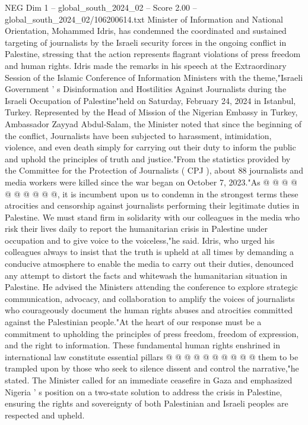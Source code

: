\begin{textsample}{NEG Dim 1 – global\_south\_2024\_02 – Score 2.00 – global\_south\_2024\_02/106200614.txt}  \label{ex:f1_neg_426}
Minister of Information and National Orientation, Mohammed Idris, has condemned the coordinated and sustained targeting of journalists by the Israeli security forces in the ongoing conflict in Palestine, stressing that the action represents flagrant violations of press freedom and human rights.
Idris made the remarks in his speech at the Extraordinary Session of the Islamic Conference of Information Ministers with the theme,"Israeli Government ' s Disinformation and Hostilities Against Journalists during the Israeli Occupation of Palestine"held on Saturday, February 24, 2024 in Istanbul, Turkey.
Represented by the Head of Mission of the Nigerian Embassy in Turkey, Ambassador Zayyad Abdul-Salam, the Minister noted that since the beginning of the conflict, Journalists have been subjected to harassment, intimidation, violence, and even death simply for carrying out their duty to inform the public and uphold the principles of truth and justice."From the statistics provided by the Committee for the Protection of Journalists ( CPJ ), about 88 journalists and media workers were killed since the war began on October 7, 2023."As @ @ @ @ @ @ @ @ @ @, it is incumbent upon us to condemn in the strongest terms these atrocities and censorship against journalists performing their legitimate duties in Palestine.
We must stand firm in solidarity with our colleagues in the media who risk their lives daily to report the humanitarian crisis in Palestine under occupation and to give voice to the voiceless,"he said.
Idris, who urged his colleagues always to insist that the truth is upheld at all times by demanding a conducive atmosphere to enable the media to carry out their duties, denounced any attempt to distort the facts and whitewash the humanitarian situation in Palestine.
He advised the Ministers attending the conference to explore strategic communication, advocacy, and collaboration to amplify the voices of journalists who courageously document the human rights abuses and atrocities committed against the Palestinian people."At the heart of our response must be a commitment to upholding the principles of press freedom, freedom of expression, and the right to information.
These fundamental human rights enshrined in international law constitute essential pillars @ @ @ @ @ @ @ @ @ @ them to be trampled upon by those who seek to silence dissent and control the narrative,"he stated.
The Minister called for an immediate ceasefire in Gaza and emphasized Nigeria ' s position on a two-state solution to address the crisis in Palestine, ensuring the rights and sovereignty of both Palestinian and Israeli peoples are respected and upheld.

\end{textsample}
